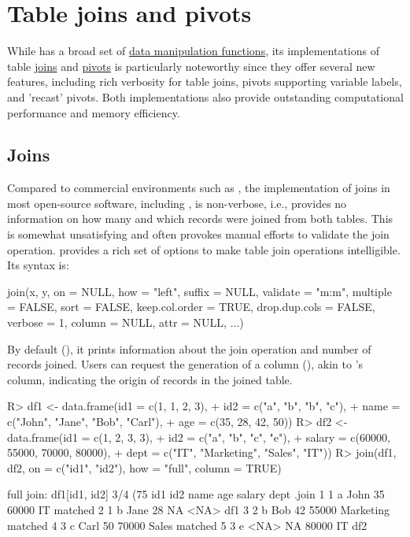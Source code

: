 \documentclass[article]{jss}
\begin{document}
\section{Table joins and pivots} \label{sec:join_pivot}
%
While  has a broad set of \href{https://sebkrantz.github.io/collapse/reference/fast-data-manipulation.html}{data manipulation functions}, its implementations of table \href{https://sebkrantz.github.io/collapse/reference/join.html}{joins} and \href{https://sebkrantz.github.io/collapse/reference/pivot.html}{pivots} is particularly noteworthy since they offer several new features, including rich verbosity for table joins, pivots supporting variable labels, and 'recast' pivots. Both implementations also provide outstanding computational performance and memory efficiency.
%
\subsection{Joins}
%
Compared to commercial environments such as , the implementation of joins in most open-source software, including , is non-verbose, i.e., provides no information on how many and which records were joined from both tables. This is somewhat unsatisfying and often provokes manual efforts to validate the join operation.  provides a rich set of options to make table join operations intelligible. Its syntax is:
\begin{Code}
join(x, y, on = NULL, how = "left", suffix = NULL, validate = "m:m",
     multiple = FALSE, sort = FALSE, keep.col.order = TRUE,
     drop.dup.cols = FALSE, verbose = 1, column = NULL, attr = NULL, ...)
\end{Code}
By default (), it prints information about the join operation and number of records joined. Users can request the generation of a  column (), akin to 's  column, indicating the origin of records in the joined table.
%
\begin{Schunk}
\begin{Sinput}
R> df1 <- data.frame(id1 = c(1, 1, 2, 3),
+                    id2 = c("a", "b", "b", "c"),
+                    name = c("John", "Jane", "Bob", "Carl"),
+                    age = c(35, 28, 42, 50))
R> df2 <- data.frame(id1 = c(1, 2, 3, 3),
+                    id2 = c("a", "b", "c", "e"),
+                    salary = c(60000, 55000, 70000, 80000),
+                    dept = c("IT", "Marketing", "Sales", "IT"))
R> join(df1, df2, on = c("id1", "id2"), how = "full", column = TRUE)
\end{Sinput}
\begin{Soutput}
full join: df1[id1, id2] 3/4 (75%) <m:m> df2[id1, id2] 3/4 (75%)
  id1 id2 name age salary      dept   .join
1   1   a John  35  60000        IT matched
2   1   b Jane  28     NA      <NA>     df1
3   2   b  Bob  42  55000 Marketing matched
4   3   c Carl  50  70000     Sales matched
5   3   e <NA>  NA  80000        IT     df2
\end{Soutput}
\end{Schunk}
\end{document}

